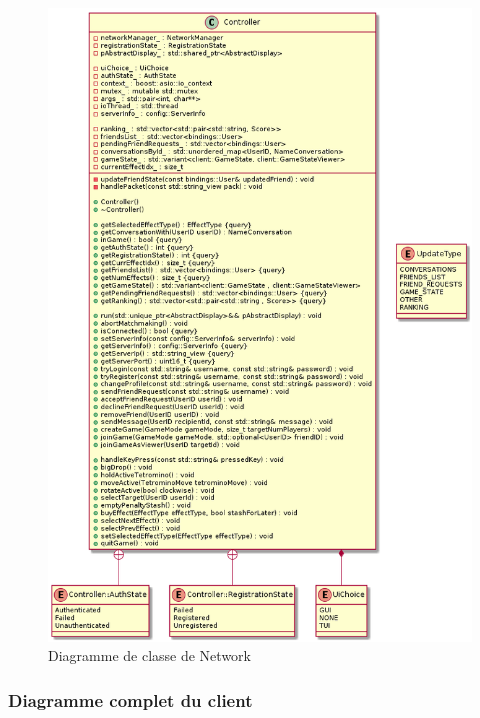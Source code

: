 \documentclass{article}
\begin{document}
\begin{figure}[H]
	\centering
	 \includegraphics[scale=0.3]{../../res/uml/class/ControllerClass.png}
	 \caption{Diagramme de classe de Network}
	 \label{fig:ControllerDiagram}
\end{figure}

\subsubsection{Diagramme complet du client}
\end{document}
